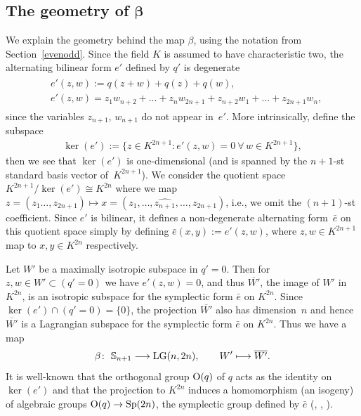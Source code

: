 \documentclass[10pt,a4paper]{amsart}
\newcommand{\bS}{{\mathbb S}}
\numberwithin{equation}{section}
\begin{document}
\subsection[The geometry of $\beta$]{The geometry of $\boldsymbol{\beta}$}\label{geob}
We explain the geometry behind the map $\beta$, using the notation from Section~\ref{evenodd}. Since the field $K$ is assumed to have characteristic two, the alternating bilinear form $e'$ defined by $q'$ is degenerate
\begin{gather*}\begin{split}
& e'(z,w) := q(z+w) + q(z) + q(w),\\ & e'(z,w) = z_1w_{n+2}+\dots+z_nw_{2n+1} + z_{n+2}w_1+\dots+z_{2n+1}w_n,\end{split}
\end{gather*}
since the variables $z_{n+1}$, $w_{n+1}$ do not appear in~$e'$. More intrinsically, define the subspace
\begin{gather*}
\ker(e') := \big\{z\in K^{2n+1}\colon e'(z,w)=0 \ \forall\, w\in K^{2n+1} \big\},
\end{gather*}
then we see that $\ker(e')$ is one-dimensional (and is spanned by the $n+1$-st standard basis vector of~$K^{2n+1}$). We consider the quotient space $K^{2n+1}/\ker(e')\cong K^{2n}$ where we map $z=(z_1\ldots,z_{2n+1})\mapsto x=(z_1,\ldots, \widehat{z_{n+1}},\ldots,z_{2n+1})$, i.e., we omit the $(n+1)$-st coefficient. Since $e'$ is bilinear, it defines a non-degenerate alternating form~$\bar{e}$ on this quotient space simply by defining $\bar{e}(x,y):=e'(z,w)$, where $z,w\in K^{2n+1}$ map to $x,y\in K^{2n}$ respectively.

Let $W'$ be a maximally isotropic subspace in $q'=0$. Then for $z,w\in W'\subset (q'=0)$ we have $e'(z,w)=0$, and thus $\overline{W'}$, the image of $W'$ in $K^{2n}$, is an isotropic subspace for the symplectic form $\bar{e}$ on $K^{2n}$. Since $\ker(e')\cap (q'=0)=\{0\}$, the projection $\overline{W'}$ also has dimension~$n$ and hence~$\overline{W'}$ is a Lagrangian subspace for the symplectic form $\bar{e}$ on $K^{2n}$. Thus we have a map
\begin{gather*}
\beta\colon \ \bS_{n+1} \longrightarrow {\rm LG}(n,2n),\qquad W' \longmapsto \overline{W'}.
\end{gather*}
It is well-known that the orthogonal group ${\rm O}(q)$ of $q$ acts as the identity on $\ker(e')$ and that the projection to $K^{2n}$ induces a homomorphism (an isogeny) of algebraic groups ${\rm O}(q)\rightarrow {\rm Sp}(2n)$, the symplectic group defined by $\bar{e}$ (\cite[Section~4.11]{Steinberg}, \cite{Milne}, \cite[Section~7.1, Remark~7.1.6]{CGP}).
\end{document}

